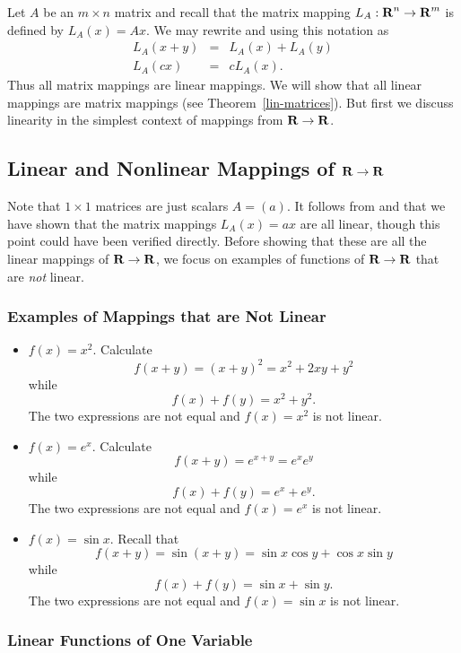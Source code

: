 Let $A$ be an $m\times n$ matrix and recall that the matrix mapping
$L_A:\mbox{$\bf{R}$}^n\to\mbox{$\bf{R}$}^m$ is defined by $L_A(x)=Ax$.  We may rewrite  and
 using this notation as
\begin{eqnarray*}
L_A(x+y) & = & L_A(x) + L_A(y) \\
L_A(cx) & = & cL_A(x).
\end{eqnarray*}
Thus all matrix mappings are linear
mappings.  We will show that all linear
mappings are matrix mappings (see Theorem~\ref{lin-matrices}).  But first
we discuss linearity in the simplest context of mappings from $\mbox{$\bf{R}$}\to\mbox{$\bf{R}$}$.

\subsection*{Linear and Nonlinear Mappings of $\mbox{$\bf{R}$}\to\mbox{$\bf{R}$}$}

Note that $1\times 1$ matrices are just scalars $A=(a)$.  It follows from
 and  that we have shown that the matrix mappings
$L_A(x)=ax$ are all linear, though this point could have been verified
directly.  Before showing that these are all the linear mappings of
$\mbox{$\bf{R}$}\to\mbox{$\bf{R}$}$, we focus on examples of functions of $\mbox{$\bf{R}$}\to\mbox{$\bf{R}$}$ that are
{\em not\/} linear.

\subsubsection*{Examples of Mappings that are Not Linear}

\begin{itemize}
\item   $f(x)=x^2$.  Calculate
\[
f(x+y) = (x+y)^2 = x^2+2xy+y^2
\]
while
\[
f(x)+f(y) = x^2 + y^2.
\]
The two expressions are not equal and $f(x)=x^2$ is not linear.
\item   $f(x)=e^x$.  Calculate
\[
f(x+y) = e^{x+y} = e^x e^y
\]
while
\[
f(x)+f(y) = e^x + e^y.
\]
The two expressions are not equal and $f(x)=e^x$ is not linear.
\item   $f(x) = \sin x$.  Recall that
\[
f(x+y) =\sin(x+y) = \sin x \cos y +\cos x \sin y
\]
while
\[
f(x)+f(y) = \sin x + \sin y.
\]
The two expressions are not equal and $f(x)=\sin x $ is not
linear.
\end{itemize}

\subsubsection*{Linear Functions of One Variable}

